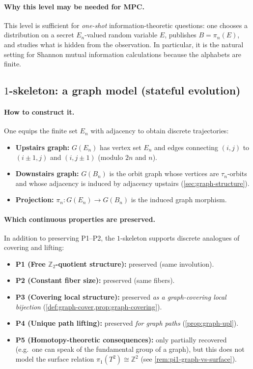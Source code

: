 \documentclass[11pt,a4paper]{article}
\theoremstyle{definition}
\theoremstyle{remark}
\begin{document}
\paragraph{Why this level may be needed for MPC.}
This level is sufficient for \emph{one-shot} information-theoretic questions: one chooses a distribution on a secret \(E_n\)-valued random variable \(E\), publishes \(B=\pi_n(E)\), and studies what is hidden from the observation. In particular, it is the natural setting for Shannon mutual information calculations because the alphabets are finite.

\subsection{\(1\)-skeleton: a graph model (stateful evolution)}
\label{sec:sk1}

\paragraph{How to construct it.}
One equips the finite set \(E_n\) with adjacency to obtain discrete trajectories:
\begin{itemize}
  \item \textbf{Upstairs graph:} \(G(E_n)\) has vertex set \(E_n\) and edges connecting \((i,j)\) to \((i\pm 1,j)\) and \((i,j\pm 1)\) (modulo \(2n\) and \(n\)).
  \item \textbf{Downstairs graph:} \(G(B_n)\) is the orbit graph whose vertices are \(\tau_n\)-orbits and whose adjacency is induced by adjacency upstairs (\cref{sec:graph-structure}).
  \item \textbf{Projection:} \(\pi_n:G(E_n)\to G(B_n)\) is the induced graph morphism.
\end{itemize}

\paragraph{Which continuous properties are preserved.}
In addition to preserving P1--P2, the \(1\)-skeleton supports discrete analogues of covering and lifting:
\begin{itemize}
  \item \textbf{P1 (Free \(\mathbb{Z}_2\)-quotient structure):} preserved (same involution).
  \item \textbf{P2 (Constant fiber size):} preserved (same fibers).
  \item \textbf{P3 (Covering local structure):} preserved \emph{as a graph-covering local bijection} (\cref{def:graph-cover,prop:graph-covering}).
  \item \textbf{P4 (Unique path lifting):} preserved \emph{for graph paths} (\cref{prop:graph-upl}).
  \item \textbf{P5 (Homotopy-theoretic consequences):} only partially recovered (e.g.\ one can speak of the fundamental group of a graph), but this does not model the surface relation \(\pi_1(T^2)\cong\mathbb{Z}^2\) (see \cref{rem:pi1-graph-vs-surface}).
\end{itemize}
\end{document}

